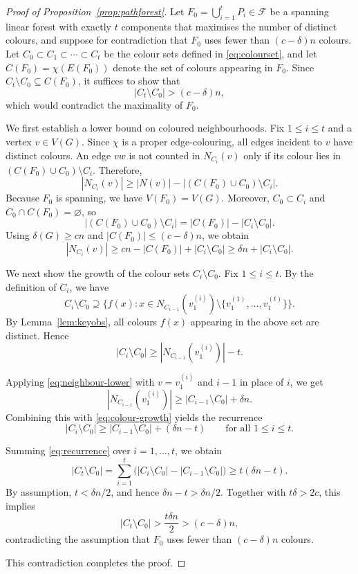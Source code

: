 \documentclass[11pt,reqno]{amsart}
\theoremstyle{definition}
\theoremstyle{remark}
\renewcommand\le{\leqslant}
\renewcommand\ge{\geqslant}
\begin{document}
\begin{proof}[Proof of Proposition~\ref{prop:pathforest}]
Let $F_0=\bigcup_{i=1}^t P_i\in\mathcal F$ be a spanning linear forest with exactly $t$
components that maximises the number of distinct colours, and suppose for
contradiction that $F_0$ uses fewer than $(c-\delta)n$ colours.
Let $C_0\subset C_1\subset\cdots\subset C_t$ be the colour sets defined in
\eqref{eq:colourset}, and let $C(F_0)=\chi(E(F_0))$ denote the set of colours appearing
in $F_0$.
Since $C_t\setminus C_0\subseteq C(F_0)$, it suffices to show that
\[
|C_t\setminus C_0|>(c-\delta)n,
\]
which would contradict the maximality of $F_0$.

We first establish a lower bound on coloured neighbourhoods. Fix $1\le i\le t$ and a vertex $v\in V(G)$.
Since $\chi$ is a proper edge-colouring, all edges incident to $v$ have distinct
colours.
An edge $vw$ is not counted in $N_{C_i}(v)$ only if its colour lies in
$(C(F_0)\cup C_0)\setminus C_i$.
Therefore,
\[
|N_{C_i}(v)|
\ge |N(v)| - |(C(F_0)\cup C_0)\setminus C_i|.
\]
Because $F_0$ is spanning, we have $V(F_0)=V(G)$.
Moreover, $C_0\subset C_i$ and $C_0\cap C(F_0)=\varnothing$, so
\[
|(C(F_0)\cup C_0)\setminus C_i|
=|C(F_0)|-|C_i\setminus C_0|.
\]
Using $\delta(G)\ge cn$ and $|C(F_0)|\le(c-\delta)n$, we obtain
\begin{equation}\label{eq:neighbour-lower}
|N_{C_i}(v)|\ge cn-|C(F_0)|+|C_i\setminus C_0|
\ge \delta n+|C_i\setminus C_0|.
\end{equation}

We next show the growth of the colour sets $C_i\setminus C_0$.
Fix $1\le i\le t$.
By the definition of $C_i$, we have
\[
C_i\setminus C_0
\supseteq
\Big\{f(x):x\in N_{C_{i-1}}(v_1^{(i)})\setminus\{v_1^{(1)},\ldots,v_1^{(t)}\}\Big\}.
\]
By Lemma~\ref{lem:keyobs}, all colours $f(x)$ appearing in the above set are distinct.
Hence
\begin{equation}\label{eq:colour-growth}
|C_i\setminus C_0|
\ge |N_{C_{i-1}}(v_1^{(i)})|-t.
\end{equation}

Applying \eqref{eq:neighbour-lower} with $v=v_1^{(i)}$ and $i-1$ in place of $i$, we get
\[
|N_{C_{i-1}}(v_1^{(i)})|
\ge |C_{i-1}\setminus C_0|+\delta n.
\]
Combining this with \eqref{eq:colour-growth} yields the recurrence
\begin{equation}\label{eq:recurrence}
|C_i\setminus C_0|
\ge |C_{i-1}\setminus C_0|+(\delta n-t)
\qquad\text{for all }1\le i\le t.
\end{equation}

Summing \eqref{eq:recurrence} over $i=1,\ldots,t$, we obtain
\[
|C_t\setminus C_0|
=\sum_{i=1}^t\big(|C_i\setminus C_0|-|C_{i-1}\setminus C_0|\big)
\ge t(\delta n-t).
\]
By assumption, $t<\delta n/2$, and hence $\delta n-t>\delta n/2$.
Together with $t\delta>2c$, this implies
\[
|C_t\setminus C_0|
> \frac{t\delta n}{2}
> (c-\delta)n,
\]
contradicting the assumption that $F_0$ uses fewer than $(c-\delta)n$ colours.

This contradiction completes the proof.
\end{proof}
\end{document}
